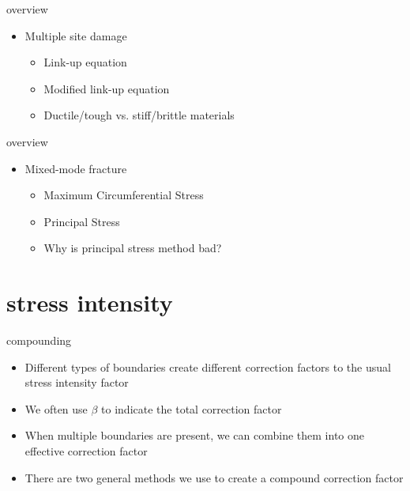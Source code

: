 \documentclass[10pt]{beamer}
\begin{document}
\begin{frame}{overview}
	\begin{itemize}[<+->]
		\item Multiple site damage
		\begin{itemize}[<+->]
			\item Link-up equation
			\item Modified link-up equation
			\item Ductile/tough vs. stiff/brittle materials
		\end{itemize}
	\end{itemize}
\end{frame}

\begin{frame}{overview}
	\begin{itemize}[<+->]
		\item Mixed-mode fracture
		\begin{itemize}[<+->]
			\item Maximum Circumferential Stress
			\item Principal Stress
			\item Why is principal stress method bad?
		\end{itemize}
	\end{itemize}
\end{frame}

\section{stress intensity}

\begin{frame}{compounding}
	\begin{itemize}
		\item Different types of boundaries create different correction factors to the usual stress intensity factor
		\item We often use $\beta$ to indicate the total correction factor
		\item When multiple boundaries are present, we can combine them into one effective correction factor
		\item There are two general methods we use to create a compound correction factor
	\end{itemize}
\end{frame}
\end{document}
